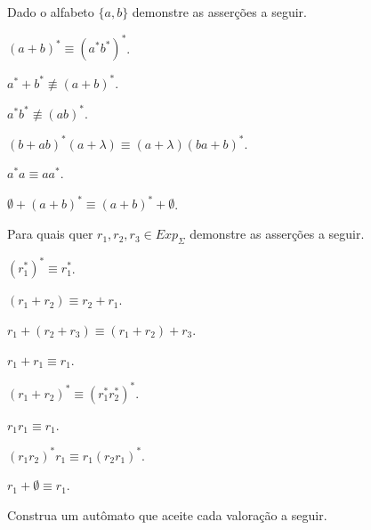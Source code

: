 \begin{questao}\label{exer:EGR40}
	Dado o alfabeto $\{a, b\}$ demonstre as asserções a seguir.
\end{questao}

\begin{exerList}
	\item $(a + b)^* \equiv (a^*b^*)^*$.
	\item $a^* + b^* \not\equiv (a + b)^*$.
	\item $a^*b^* \not\equiv (ab)^*$.
	\item $(b + ab)^* (a + \lambda) \equiv (a + \lambda)(ba + b)^*$.
	\item $a^*a \equiv aa^*$.
	\item $\emptyset + (a + b)^* \equiv (a + b)^* + \emptyset$.
\end{exerList}

\begin{questao}\label{exer:EGR41}
	Para quais quer $r_1, r_2, r_3 \in Exp_\Sigma$ demonstre as asserções a seguir.
\end{questao}

\begin{exerList}
	\item $(r_1^*)^* \equiv r_1^*$.
	\item $(r_1 + r_2) \equiv r_2 + r_1$.
	\item $r_1 + (r_2 + r_3) \equiv (r_1 + r_2) + r_3$.
	\item $r_1 + r_1 \equiv r_1$.
	\item $(r_1 + r_2)^* \equiv (r_1^* r_2^*)^*$.
	\item $r_1r_1 \equiv r_1$.
	\item $(r_1r_2)^*r_1 \equiv r_1(r_2r_1)^*$.
	\item $r_1 + \emptyset \equiv r_1$.
\end{exerList}

\begin{questao}\label{exer:EGR42}
	Construa um autômato que aceite cada valoração a seguir.
\end{questao}

